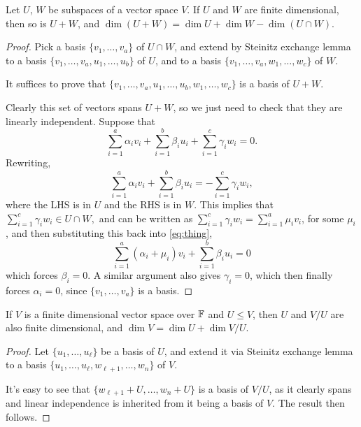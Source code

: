 \documentclass[a4paper]{scrartcl}
\begin{document}
\begin{proposition}
    Let $U$, $W$ be subspaces of a vector space $V$. If $U$ and $W$ are finite dimensional, then so is $U + W$, and $\dim (U + W) = \dim U + \dim W - \dim (U \cap W)$.
\end{proposition}
\begin{proof}
    Pick a basis $\{v_1, \dots, v_a\}$ of $U \cap W$, and extend by Steinitz exchange lemma to a basis $\{v_1, \dots, v_a, u_1, \dots, u_b\}$ of $U$, and to a basis $\{v_1, \dots, v_a, w_1, \dots, w_c\}$ of $W$.
    
    It suffices to prove that $\{v_1, \dots, v_a, u_1, \dots, u_b, w_1, \dots, w_c\}$ is a basis of $U + W$.

    Clearly this set of vectors spans $U + W$, so we just need to check that they are linearly independent. Suppose that
    $$
    \sum_{i = 1}^{a} \alpha_i v_i + \sum_{i = 1}^b \beta_i u_i + \sum_{i = 1}^c \gamma_i w_i = 0.
    $$
    Rewriting,
    \begin{equation}\label{eq:thing}
        \sum_{i = 1}^{a} \alpha_i v_i + \sum_{i = 1}^b \beta_i u_i = -\sum_{i = 1}^c \gamma_i w_i, \tag{$\dagger$}
    \end{equation}
    where the LHS is in $U$ and the RHS is in $W$. This implies that
    $
    \sum_{i = 1}^c \gamma_i w_i \in U \cap W,
    $
    and can be written as 
    $
    \sum_{i = 1}^c \gamma_i w_i = \sum_{i = 1}^a  \mu_i v_i$,
    for some $\mu_i$, and then substituting this back into \eqref{eq:thing},
    $$
    \sum_{i = 1}^a (\alpha_i + \mu_i) v_i + \sum_{i = 1}^b \beta_i u_i = 0
    $$
    which forces $\beta_i = 0$. A similar argument also gives $\gamma_i = 0$, which then finally forces $\alpha_i = 0$, since $\{v_1, \dots, v_a\}$ is a basis.
\end{proof}

\begin{proposition}
    If $V$ is a finite dimensional vector space over $\mathbb{F}$ and $U \leq V$, then $U$ and $V / U$ are also finite dimensional, and $\dim V = \dim U + \dim V / U$.
\end{proposition}
\begin{proof}
    Let $\{u_1, \dots, u_\ell\}$ be a basis of $U$, and extend it via Steinitz exchange lemma to a basis $\{u_1, \dots, u_\ell, w_{\ell+1}, \dots, w_n\}$ of $V$.

    It's easy to see that $\{w_{\ell + 1} + U, \dots, w_{n} + U\}$ is a basis of $V/U$, as it clearly spans and linear independence is inherited from it being a basis of $V$. The result then follows.
\end{proof}
\end{document}
